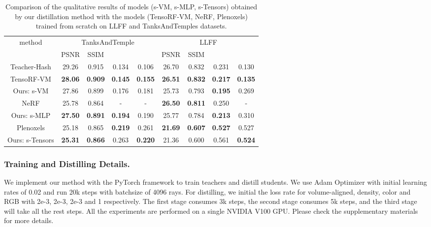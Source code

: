 \documentclass[letterpaper]{article} \usepackage{aaai23}  \usepackage{times}  \usepackage{helvet}  \usepackage{courier}  \usepackage[hyphens]{url}  \usepackage{graphicx} \urlstyle{rm} \def\UrlFont{\rm}  \usepackage{natbib}  \usepackage{caption} \frenchspacing  \setlength{\pdfpagewidth}{8.5in}  \setlength{\pdfpageheight}{11in}  \usepackage{multirow}
\begin{document}
\begin{table*}[t]
\centering
\begin{tabular}{c|cccc|cccc}
\hline
\multirow{2}{*}{method} & \multicolumn{4}{c|}{TanksAndTemple}                                            & \multicolumn{4}{c}{LLFF}                                                       \\ \cline{2-9} 
                        & PSNR           & SSIM           &  &  & PSNR           & SSIM           &  &  \\ \hline
Teacher-Hash            & 29.26          & 0.915          & 0.134                 & 0.106                & 26.70          & 0.832          & 0.231                 & 0.130                \\ \hline
TensoRF-VM              & \textbf{28.06} & \textbf{0.909} & \textbf{0.145}        & \textbf{0.155}       & \textbf{26.51} & \textbf{0.832} & \textbf{0.217}        & \textbf{0.135}       \\
Ours: s-VM              & 27.86          & 0.899          & 0.176        & 0.181                & 25.73          & 0.793          & \textbf{0.195}        & 0.269                \\ \hline
NeRF                    & 25.78 & 0.864 & -                     & -                    & \textbf{26.50} & \textbf{0.811} & 0.250                 & -                    \\
Ours: s-MLP             & \textbf{27.50} & \textbf{0.891} & \textbf{0.194}        & 0.190                & 25.77 & 0.784 & \textbf{0.213}        & 0.310                \\ \hline
Plenoxels               & 25.18 & 0.865 & \textbf{0.219}        & 0.261                & \textbf{21.69} & \textbf{0.607} & \textbf{0.527}        & 0.527                \\
Ours: s-Tensors          & \textbf{25.31} & \textbf{0.866} & 0.263                 & \textbf{0.220}       & 21.36 & 0.600 & 0.561                 & \textbf{0.524}       \\ \hline
\end{tabular}
\caption{Comparison of the qualitative results of models (s-VM, s-MLP, s-Tensors) obtained by our distillation method with the models (TensoRF-VM, NeRF, Plenoxels) trained from scratch on LLFF and TanksAndTemples datasets.}
\label{table-INGP2others}
\end{table*}


\subsubsection{Training and Distilling Details.} We implement our method with the PyTorch framework \cite{paszke2019pytorch} to train teachers and distill students. We use Adam Optimizer \cite{kingma2014adam} with initial learning rates of 0.02 and run 20k steps with batchsize of 4096 rays. For distilling, we initial the loss rate for volume-aligned, density, color and RGB with 2e-3, 2e-3, 2e-3 and 1 respectively. The first stage consumes 3k steps, the second stage consumes 5k steps, and the third stage will take all the rest steps. All the experiments are performed on a single NVIDIA V100 GPU. 
Please check the supplementary materials for more details.
\end{document}
